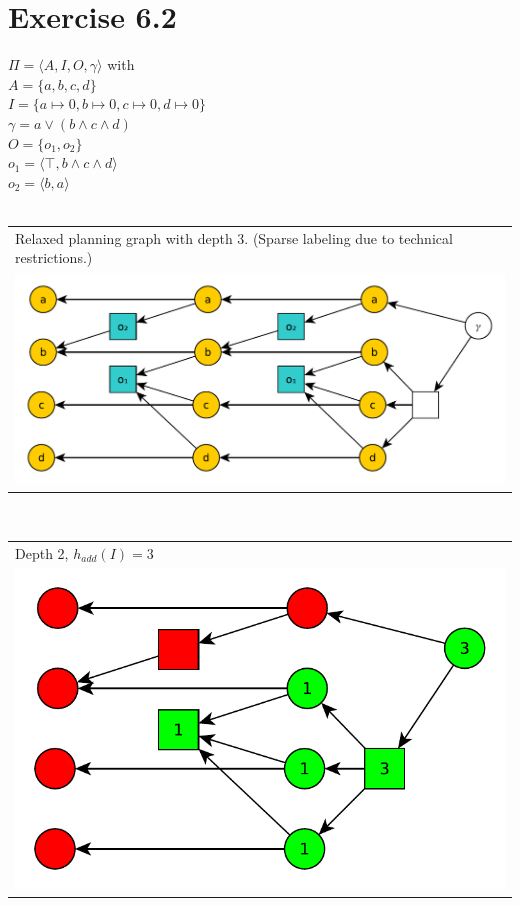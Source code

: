 \documentclass[11pt,a4paper]{article}
\begin{document}
\section*{Exercise 6.2}
$\Pi = \langle A,I,O,\gamma \rangle$ with\\
$A = \{a,b,c,d\}$\\
$I = \{a\mapsto 0,b\mapsto 0,c\mapsto 0,d\mapsto 0\}$\\
$\gamma = a\lor (b\land c\land d)$\\
$O=\{o_1,o_2\}$\\
$o_1=\langle \top, b\land c\land d\rangle$\\
$o_2=\langle b, a\rangle$\\
\\
\begin{tabular}{l} %
Relaxed planning graph with depth 3. (Sparse labeling due to technical restrictions.)\\
\includegraphics[scale=0.5]{g62}\\
\end{tabular}\\

\begin{tabular}{l} %
Depth 2, $h_{add}(I)=3$\\
\includegraphics[scale=0.5]{g622}\\
\end{tabular}\\
\end{document}
